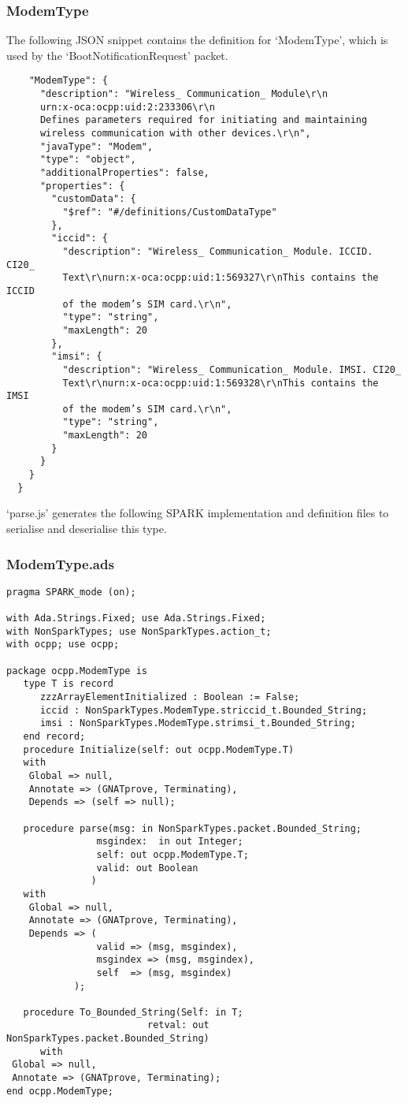 \documentclass[12pt,openany,a4paper]{book}
\begin{document}
\subsubsection{ModemType}
The following JSON snippet contains the definition for `ModemType', which is used by the `BootNotificationRequest' packet.

\begin{verbatim}
    "ModemType": {
      "description": "Wireless_ Communication_ Module\r\n
      urn:x-oca:ocpp:uid:2:233306\r\n
      Defines parameters required for initiating and maintaining 
      wireless communication with other devices.\r\n",
      "javaType": "Modem",
      "type": "object",
      "additionalProperties": false,
      "properties": {
        "customData": {
          "$ref": "#/definitions/CustomDataType"
        },
        "iccid": {
          "description": "Wireless_ Communication_ Module. ICCID. CI20_ 
          Text\r\nurn:x-oca:ocpp:uid:1:569327\r\nThis contains the ICCID 
          of the modem’s SIM card.\r\n",
          "type": "string",
          "maxLength": 20
        },
        "imsi": {
          "description": "Wireless_ Communication_ Module. IMSI. CI20_ 
          Text\r\nurn:x-oca:ocpp:uid:1:569328\r\nThis contains the IMSI 
          of the modem’s SIM card.\r\n",
          "type": "string",
          "maxLength": 20
        }
      }
    }
  }
\end{verbatim}

`parse.js' generates the following SPARK implementation and definition files to serialise and deserialise this type.

\subsubsection{ModemType.ads}
\begin{verbatim}
pragma SPARK_mode (on); 

with Ada.Strings.Fixed; use Ada.Strings.Fixed;
with NonSparkTypes; use NonSparkTypes.action_t; 
with ocpp; use ocpp;

package ocpp.ModemType is
   type T is record
      zzzArrayElementInitialized : Boolean := False;
      iccid : NonSparkTypes.ModemType.striccid_t.Bounded_String;
      imsi : NonSparkTypes.ModemType.strimsi_t.Bounded_String;
   end record;
   procedure Initialize(self: out ocpp.ModemType.T)
   with
    Global => null,
    Annotate => (GNATprove, Terminating),
    Depends => (self => null);

   procedure parse(msg: in NonSparkTypes.packet.Bounded_String;
                msgindex:  in out Integer;
                self: out ocpp.ModemType.T;
                valid: out Boolean
               )
   with
    Global => null,
    Annotate => (GNATprove, Terminating),
    Depends => (
                valid => (msg, msgindex),
                msgindex => (msg, msgindex),
                self  => (msg, msgindex)
            );

   procedure To_Bounded_String(Self: in T;
                         retval: out NonSparkTypes.packet.Bounded_String)
      with
 Global => null,
 Annotate => (GNATprove, Terminating);
end ocpp.ModemType;

\end{verbatim}
\end{document}
